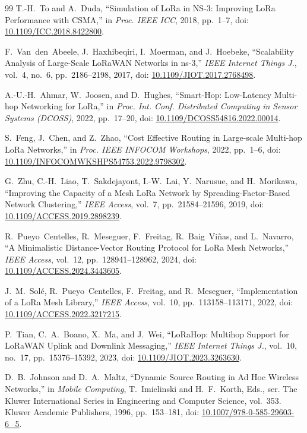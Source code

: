 \begin{thebibliography}{99}
T.-H.~To and A.~Duda,
``Simulation of LoRa in NS-3: Improving LoRa Performance with CSMA,''
in \emph{Proc. IEEE ICC}, 2018, pp.~1--7,
doi: \url{10.1109/ICC.2018.8422800}.

F.~Van~den~Abeele, J.~Haxhibeqiri, I.~Moerman, and J.~Hoebeke,
``Scalability Analysis of Large-Scale LoRaWAN Networks in ns-3,''
\emph{IEEE Internet Things J.}, vol.~4, no.~6, pp.~2186--2198, 2017,
doi: \url{10.1109/JIOT.2017.2768498}.

A.-U.-H.~Ahmar, W.~Joosen, and D.~Hughes,
``Smart-Hop: Low-Latency Multi-hop Networking for LoRa,''
in \emph{Proc. Int. Conf. Distributed Computing in Sensor Systems (DCOSS)}, 2022, pp.~17--20,
doi: \url{10.1109/DCOSS54816.2022.00014}.

S.~Feng, J.~Chen, and Z.~Zhao,
``Cost Effective Routing in Large-scale Multi-hop LoRa Networks,''
in \emph{Proc. IEEE INFOCOM Workshops}, 2022, pp.~1--6,
doi: \url{10.1109/INFOCOMWKSHPS54753.2022.9798302}.

G.~Zhu, C.-H.~Liao, T.~Sakdejayont, I.-W.~Lai, Y.~Narusue, and H.~Morikawa,
``Improving the Capacity of a Mesh LoRa Network by Spreading-Factor-Based Network Clustering,''
\emph{IEEE Access}, vol.~7, pp.~21584--21596, 2019,
doi: \url{10.1109/ACCESS.2019.2898239}.

R.~Pueyo~Centelles, R.~Meseguer, F.~Freitag, R.~Baig~Vi{\~n}as, and L.~Navarro,
``A Minimalistic Distance-Vector Routing Protocol for LoRa Mesh Networks,''
\emph{IEEE Access}, vol.~12, pp.~128941--128962, 2024,
doi: \url{10.1109/ACCESS.2024.3443605}.

J.~M.~Sol{\'e}, R.~Pueyo~Centelles, F.~Freitag, and R.~Meseguer,
``Implementation of a LoRa Mesh Library,''
\emph{IEEE Access}, vol.~10, pp.~113158--113171, 2022,
doi: \url{10.1109/ACCESS.2022.3217215}.

P.~Tian, C.~A.~Boano, X.~Ma, and J.~Wei,
``LoRaHop: Multihop Support for LoRaWAN Uplink and Downlink Messaging,''
\emph{IEEE Internet Things J.}, vol.~10, no.~17, pp.~15376--15392, 2023,
doi: \url{10.1109/JIOT.2023.3263630}.

D.~B.~Johnson and D.~A.~Maltz,
``Dynamic Source Routing in Ad Hoc Wireless Networks,''
in \emph{Mobile Computing}, T.~Imielinski and H.~F.~Korth, Eds.,
ser. The Kluwer International Series in Engineering and Computer Science,
vol.~353. Kluwer Academic Publishers, 1996, pp.~153--181,
doi: \url{10.1007/978-0-585-29603-6_5}.


\end{thebibliography}
